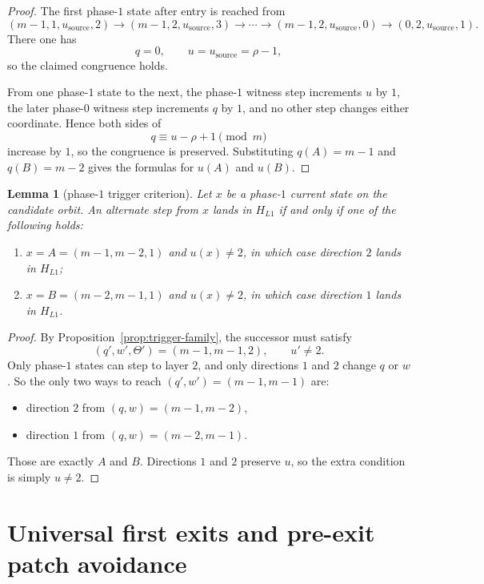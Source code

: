 \documentclass[11pt]{article}
\newtheorem{lemma}[theorem]{Lemma}
\begin{document}
\begin{proof}
The first phase-$1$ state after entry is reached from
\[
(m-1,1,u_{\mathrm{source}},2)\to(m-1,2,u_{\mathrm{source}},3)
\to\cdots\to(m-1,2,u_{\mathrm{source}},0)\to(0,2,u_{\mathrm{source}},1).
\]
There one has
\[
q=0,
\qquad
u=u_{\mathrm{source}}=\rho-1,
\]
so the claimed congruence holds.

From one phase-$1$ state to the next, the phase-$1$ witness step increments
$u$ by $1$, the later phase-$0$ witness step increments $q$ by $1$, and no
other step changes either coordinate. Hence both sides of
\[
q\equiv u-\rho+1 \pmod m
\]
increase by $1$, so the congruence is preserved.
Substituting $q(A)=m-1$ and $q(B)=m-2$ gives the formulas for $u(A)$ and
$u(B)$.
\end{proof}

\begin{lemma}[phase-$1$ trigger criterion]\label{lem:trigger-criterion}
Let $x$ be a phase-$1$ current state on the candidate orbit.
An alternate step from $x$ lands in $H_{L1}$ if and only if one of the
following holds:
\begin{enumerate}[label=\textup{(\arabic*)},leftmargin=2.5em]
\item $x=A=(m-1,m-2,1)$ and $u(x)\neq 2$, in which case direction $2$ lands in
      $H_{L1}$;
\item $x=B=(m-2,m-1,1)$ and $u(x)\neq 2$, in which case direction $1$ lands in
      $H_{L1}$.
\end{enumerate}
\end{lemma}

\begin{proof}
By Proposition~\ref{prop:trigger-family}, the successor must satisfy
\[
(q',w',\Theta')=(m-1,m-1,2),
\qquad
u'\neq 2.
\]
Only phase-$1$ states can step to layer $2$, and only directions $1$ and $2$
change $q$ or $w$.
So the only two ways to reach $(q',w')=(m-1,m-1)$ are:
\begin{itemize}[leftmargin=2em]
\item direction $2$ from $(q,w)=(m-1,m-2)$,
\item direction $1$ from $(q,w)=(m-2,m-1)$.
\end{itemize}
Those are exactly $A$ and $B$.
Directions $1$ and $2$ preserve $u$, so the extra condition is simply
$u\neq 2$.
\end{proof}

\section{Universal first exits and pre-exit patch avoidance}
\end{document}
